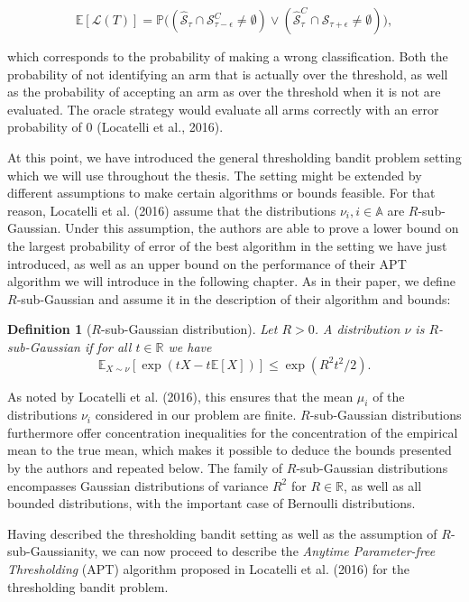\documentclass[12pt,]{article}
\newtheorem{definition}{Definition}
\begin{document}
\[
\mathbb{E}[\mathcal{L}(T)] = \mathbb{P}\big((\hat{\mathcal{S}}_{\tau} \cap \mathcal{S}_{\tau-\epsilon}^C \neq \emptyset) \lor(\hat{\mathcal{S}}_{\tau}^C \cap \mathcal{S}_{\tau+\epsilon} \neq \emptyset)\big),
\]

which corresponds to the probability of making a wrong classification.
Both the probability of not identifying an arm that is actually over the
threshold, as well as the probability of accepting an arm as over the
threshold when it is not are evaluated. The oracle strategy would
evaluate all arms correctly with an error probability of \(0\)
(Locatelli et al., 2016).

At this point, we have introduced the general thresholding bandit
problem setting which we will use throughout the thesis. The setting
might be extended by different assumptions to make certain algorithms or
bounds feasible. For that reason, Locatelli et al. (2016) assume that
the distributions \(\nu_i, i \in \mathbb{A}\) are \(R\)-sub-Gaussian.
Under this assumption, the authors are able to prove a lower bound on
the largest probability of error of the best algorithm in the setting we
have just introduced, as well as an upper bound on the performance of
their APT algorithm we will introduce in the following chapter. As in
their paper, we define \(R\)-sub-Gaussian and assume it in the
description of their algorithm and bounds:

\begin{definition}[$R$-sub-Gaussian distribution] 
\label{definition:rsubgaussian}
Let $R > 0$. A distribution $\nu$ is $R$-sub-Gaussian if for all $t \in \mathbb{R}$ we have
\begin{equation*}
\mathbb{E}_{X \sim \nu}[\exp(tX - t\mathbb{E}[X])] \leq \exp(R^2t^2/2).
\end{equation*}
\end{definition}

As noted by Locatelli et al. (2016), this ensures that the mean
\(\mu_i\) of the distributions \(\nu_i\) considered in our problem are
finite. \(R\)-sub-Gaussian distributions furthermore offer concentration
inequalities for the concentration of the empirical mean to the true
mean, which makes it possible to deduce the bounds presented by the
authors and repeated below. The family of \(R\)-sub-Gaussian
distributions encompasses Gaussian distributions of variance \(R^2\) for
\(R \in \mathbb{R}\), as well as all bounded distributions, with the
important case of Bernoulli distributions.

Having described the thresholding bandit setting as well as the
assumption of \(R\)-sub-Gaussianity, we can now proceed to describe the
\emph{Anytime Parameter-free Thresholding} (APT) algorithm proposed in
Locatelli et al. (2016) for the thresholding bandit problem.
\end{document}
